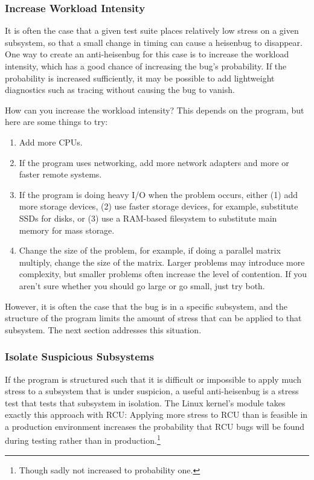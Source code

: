 \subsubsection{Increase Workload Intensity}
\label{sec:debugging:Increase Workload Intensity}

It is often the case that a given test suite places relatively
low stress on a given subsystem, so that a small change in timing
can cause a heisenbug to disappear.
One way to create an anti-heisenbug for this case is to increase
the workload intensity, which has a good chance of increasing the
bug's probability.
If the probability is increased sufficiently, it may be possible to
add lightweight diagnostics such as tracing without causing the
bug to vanish.

How can you increase the workload intensity?
This depends on the program, but here are some things to try:

\begin{enumerate}
\item	Add more CPUs.
\item	If the program uses networking, add more network adapters
	and more or faster remote systems.
\item	If the program is doing heavy I/O when the problem occurs,
	either (1) add more storage devices, (2) use faster storage
	devices, for example, substitute SSDs for disks,
	or (3) use a RAM-based filesystem to substitute main
	memory for mass storage.
\item	Change the size of the problem, for example, if doing a parallel
	matrix multiply, change the size of the matrix.
	Larger problems may introduce more complexity, but smaller
	problems often increase the level of contention.
	If you aren't sure whether you should go large or go small,
	just try both.
\end{enumerate}

However, it is often the case that the bug is in a specific subsystem,
and the structure of the program limits the amount of stress that can
be applied to that subsystem.
The next section addresses this situation.

\subsubsection{Isolate Suspicious Subsystems}
\label{sec:debugging:Isolate Suspicious Subsystems}

If the program is structured such that it is difficult or impossible
to apply much stress to a subsystem that is under suspicion,
a useful anti-heisenbug is a stress test that tests that subsystem in
isolation.
The Linux kernel's  module takes exactly this approach with RCU:
Applying more stress to RCU than is feasible in a production environment
increases the probability that RCU bugs will be found during testing
rather than in production.\footnote{
	Though sadly not increased to probability one.}

